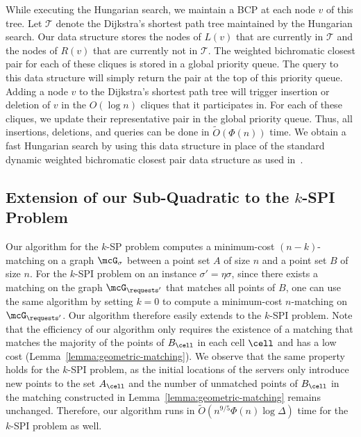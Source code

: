 While executing the Hungarian search, we maintain a BCP at each node $v$ of this tree. Let $\mathcal{T}$ denote the Dijkstra's shortest path tree maintained by the Hungarian search. Our data structure stores the nodes of $L(v)$ that are currently in $\mathcal{T}$ and the nodes of $R(v)$ that are currently not in $\mathcal{T}$. The weighted bichromatic closest pair for each of these cliques is stored in a global priority queue. The query to this data structure will simply return the pair at the top of this priority queue. Adding a node $v$ to the Dijkstra's shortest path tree will trigger insertion or deletion of $v$ in the $O(\log n)$ cliques that it participates in. For each of these cliques, we update their representative pair in the global priority queue. Thus, all insertions, deletions, and queries can be done in $\tilde{O}(\Phi(n))$ time.
We obtain a fast Hungarian search by using this data structure in place of the standard dynamic weighted bichromatic closest pair data structure as used in~\cite{ra_soda12}. 

\subsection{Extension of our Sub-Quadratic to the \texorpdfstring{$k$}{-}-SPI Problem}\label{sec:kspi-extension-sub}
Our algorithm for the $k$-SP problem computes a minimum-cost $(n-k)$-matching on a graph $\mcG_\sigma$ between a point set $A$ of size $n$ and a point set $B$ of size $n$. For the $k$-SPI problem on an instance $\sigma'=\eta\sigma$, since there exists a matching on the graph $\mcG_{\requests'}$ that matches all points of $B$, one can use the same algorithm by setting $k=0$ to compute a minimum-cost $n$-matching on $\mcG_{\requests'}$. Our algorithm therefore easily extends to the $k$-SPI problem. Note that the efficiency of our algorithm only requires the existence of a matching that matches the majority of the points of $B_\cell$ in each cell $\cell$ and has a low cost (Lemma~\ref{lemma:geometric-matching}). We observe that the same property holds for the $k$-SPI problem, as the initial locations of the servers only introduce new points to the set $A_\cell$ and the number of unmatched points of $B_\cell$ in the matching constructed in Lemma~\ref{lemma:geometric-matching} remains unchanged. Therefore, our algorithm runs in $\tilde{O}(n^{9/5}\Phi(n)\log\Delta)$ time for the $k$-SPI problem as well. 









